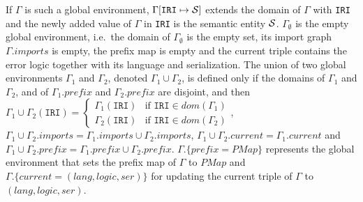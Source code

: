 \documentclass[10pt,fleqn,final]{scrreprt}
\newcommand*{\syntax}[1]{\texttt{#1}}
\newcommand{\semdom}[1]{
\begin{center}
\fbox{$#1$}
\end{center}
}
\newcommand{\prefix}{\mathit{prefix}}
\newcommand{\current}{\mathit{current}}
\newcommand{\PMap}{\mathit{PMap}}
\newenvironment{definitions}[0]{\medskip }{}
\begin{document}
\begin{definitions}
If $\Gamma$ is such a global environment, $\Gamma[\syntax{IRI} \mapsto \cS]$
extends the domain of $\Gamma$ with \syntax{IRI} and
the newly added value of $\Gamma$ in \syntax{IRI} is the semantic entity ${\cal S}$.
 $\Gamma_\emptyset$ is the empty global environment, i.e.~the domain of $\Gamma_\emptyset$ is the empty set, its import graph $\Gamma.imports$ is empty,
the prefix map is empty and the current triple contains the error logic together with its language and serialization.
The union of two global environments $\Gamma_1$ and $\Gamma_2$, 
denoted $\Gamma_1\cup\Gamma_2$, is defined only if the domains of $\Gamma_1$ and $\Gamma_2$,
and of $\Gamma_1.\prefix$ and $\Gamma_2.\prefix$ are disjoint, and then
$\Gamma_1\cup\Gamma_2(\syntax{IRI}) = \begin{cases}
\Gamma_1(\syntax{IRI})& \mbox{if } \syntax{IRI} \in dom(\Gamma_1) \\
\Gamma_2(\syntax{IRI})& \mbox{if } \syntax{IRI} \in dom(\Gamma_2)
\end{cases}$, 
$\Gamma_1\cup\Gamma_2.imports = \Gamma_1.imports \cup \Gamma_2.imports$,
$\Gamma_1\cup\Gamma_2.\current = \Gamma_1.\current$
and $\Gamma_1\cup\Gamma_2.\prefix = \Gamma_1.\prefix \cup \Gamma_2.\prefix$.
  $\Gamma.\{\prefix = \PMap\}$ represents the global environment that sets the prefix map of 
$\Gamma$ to $\PMap$ and $\Gamma.\{\current  = (lang, logic, ser)\}$ for updating the current triple of $\Gamma$ to
$(lang, logic, ser)$.



%


\end{definitions}
\end{document}
